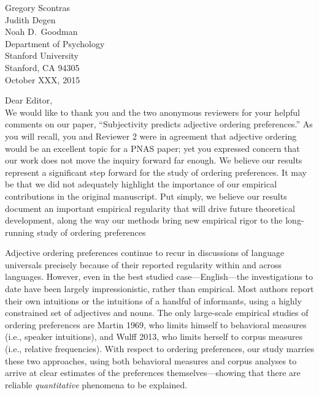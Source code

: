 \documentclass[12pt]{article}
\begin{document}
{\flushright

\vspace{25pt}
Gregory Scontras\\
Judith Degen\\
Noah D.~Goodman\\
Department of Psychology\\
Stanford University\\
Stanford, CA 94305\\[20pt]

\noindent October XXX, 2015\\[20pt]}


\noindent Dear Editor,\\

\noindent We would like to thank you and the two anonymous reviewers for your helpful comments on our paper, ``Subjectivity predicts adjective ordering preferences.'' As you will recall, you and Reviewer 2 were in agreement that adjective ordering would be an excellent topic for a PNAS paper; yet you expressed concern that our work does not move the inquiry forward far enough. We believe our results represent a significant step forward for the study of ordering preferences. It may be that we did not adequately highlight the importance of our empirical contributions in the original manuscript. Put simply, we believe our results document an important empirical regularity that will drive future theoretical development, along the way our methods bring new empirical rigor to the long-running study of ordering preferences

Adjective ordering preferences continue to recur in discussions of language universals precisely because of their reported regularity within and across languages. However, even in the best studied case---English---the investigations to date have been largely impressionistic, rather than empirical. Most authors report their own intuitions or the intuitions of a handful of informants, using a highly constrained set of adjectives and nouns. The only large-scale empirical studies of ordering preferences are Martin 1969, who limits himself to behavioral measures (i.e., speaker intuitions), and Wulff 2013, who limits herself to corpus measures (i.e., relative frequencies). With respect to ordering preferences, our study marries these two approaches, using both behavioral measures and corpus analyses to arrive at clear estimates of the preferences themselves---showing that there are reliable \emph{quantitative} phenomena to be explained.
\end{document}
